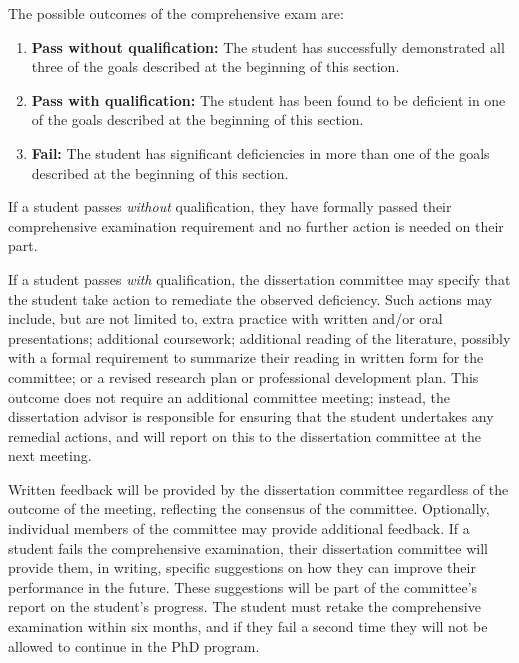 \vspace{2mm}

\noindent
The possible outcomes of the comprehensive exam are:

\begin{enumerate}
\item  \textbf{Pass without qualification:} The student has
  successfully demonstrated all three of the goals described at the
  beginning of this section.

\item  \textbf{Pass with qualification:} The student has been found to
  be deficient in one of the goals described at the beginning of this
  section.

\item  \textbf{Fail:} The student has significant deficiencies in more
  than one of the goals described at the beginning of this section.

\end{enumerate}

If a student passes \textit{without} qualification, they have formally
passed their comprehensive examination requirement and no further
action is needed on their part.

If a student passes \textit{with} qualification, the dissertation committee
may specify that the student take action to remediate the observed
deficiency.  Such actions may include, but are not limited to, extra
practice with written and/or oral presentations; additional
coursework; additional reading of the literature, possibly with a
formal requirement to summarize their reading in written form for the
committee; or a revised research plan or professional development
plan.  This outcome does not require an additional committee meeting;
instead, the dissertation advisor is responsible for ensuring that the
student undertakes any remedial actions, and will report on this to
the dissertation committee at the next meeting.

Written feedback will be provided by the dissertation committee
regardless of the outcome of the meeting, reflecting the consensus of
the committee.  Optionally, individual members of the committee may
provide additional feedback.
If a student fails the comprehensive examination, their dissertation
committee will provide them, in writing, specific suggestions on
how they can improve their performance in the future.  These
suggestions will be part of the committee's report on the student's
progress.  The student must retake
the comprehensive examination within six months, and if they fail a
second time they will not be allowed to continue in the PhD program.


